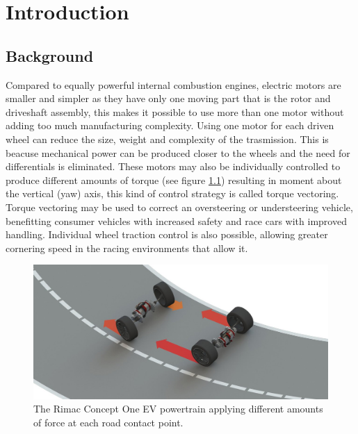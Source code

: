 \chapter{Introduction}
\label{chap:intro}
\section{Background}
\label{sec:background}


Compared to equally powerful internal combustion engines, electric motors are smaller and simpler as they have only one moving part that is the rotor and driveshaft assembly, this makes it possible to use more than one motor without adding too much manufacturing complexity.
Using one motor for each driven wheel can reduce the size, weight and complexity of the trasmission. This is beacuse mechanical power can be produced closer to the wheels and the need for differentials is eliminated.
These motors may also be individually controlled to produce different amounts of torque (see figure \ref{rimac}) resulting in moment about the vertical (yaw) axis, this kind of control strategy is called torque vectoring. Torque vectoring may be used to correct an oversteering or understeering vehicle, benefitting consumer vehicles with increased safety and race cars with improved handling.
Individual wheel traction control is also possible, allowing greater cornering speed in the racing environments that allow it.

\begin{figure}[tb]
  \centering
  \includegraphics[width=\textwidth]{images/rimac.jpg}
  \caption{The Rimac Concept One EV powertrain applying different amounts of force at each road contact point.}
  \label{rimac}
\end{figure}

